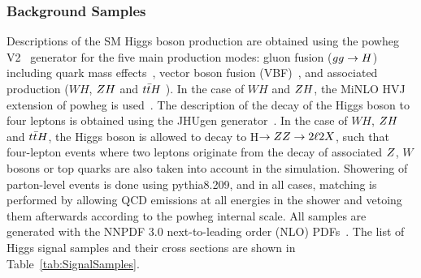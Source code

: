 \subsubsection{Background Samples}

Descriptions of the SM Higgs boson production are obtained using the 
{\sc powheg V2}~\cite{Alioli:2008gx,Nason:2004rx,Frixione:2007vw} generator for the five main production modes: 
gluon fusion ($gg\to H$) including quark mass effects~\cite{Bagnaschi:2011tu}, vector boson fusion 
(VBF)~\cite{Nason:2009ai}, and associated production ($WH$, $Z H$ and $t\bar{t} H$ \cite{Hartanto:2015uka}). 
In the case of $WH$ and $Z H$, the {\sc MiNLO HVJ} extension of {\sc powheg} is used~\cite{Luisoni:2013kna}. 
The description of the decay of the Higgs boson to four leptons is obtained using the {\sc JHUgen} 
generator~\cite{Gao:2010qx}. In the case of $WH$, $Z H$ and $t\bar{t} H$, the Higgs boson is allowed
to decay to H$\to Z Z \to 2\ell2 X$, such that four-lepton events where two leptons originate from 
the decay of associated $Z$, $W$ bosons or top quarks are also taken into account in the simulation. 
Showering of parton-level events is done using {\sc pythia8.209}, and in all cases, matching is performed by 
allowing QCD emissions at all energies in the shower and vetoing them afterwards according to the 
{\sc powheg} internal scale. All samples are generated with the NNPDF 3.0 next-to-leading order (NLO) PDFs~\cite{Ball:2014uwa}. The list of Higgs signal samples and their cross sections are shown in 
Table~\ref{tab:SignalSamples}.

